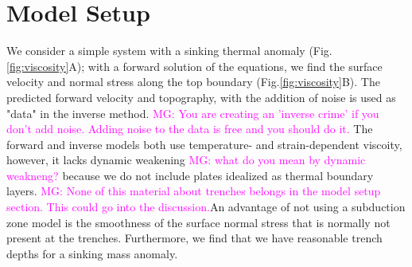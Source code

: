 \documentclass[12pt]{article}
\newcommand{\mgnote}[1]{\textcolor{magenta}{MG: #1}}
\begin{document}
\section*{Model Setup}
We consider a simple system with a sinking thermal anomaly (Fig.\ref{fig:viscosity}A); with a forward solution of the equations, we find the surface velocity and normal stress along the top boundary (Fig.\ref{fig:viscosity}B). The predicted forward velocity and topography, with the addition of noise is used as "data" in the inverse method. \mgnote{You are creating an 'inverse crime' if you don't add noise. Adding noise to the data is free and you should do it.} 
The forward and inverse models both use  temperature- and strain-dependent viscoity, however, it lacks dynamic weakening \mgnote{what do you mean by dynamic weakneng?} because we do not include plates idealized as thermal boundary layers. \mgnote{None of this material about trenches belongs in the model setup section. This could go into the discussion.}An advantage of not using a subduction zone model is the smoothness of the surface normal stress that is normally not present at the trenches. Furthermore, we find that we have reasonable trench depths for a sinking mass anomaly.
\end{document}
